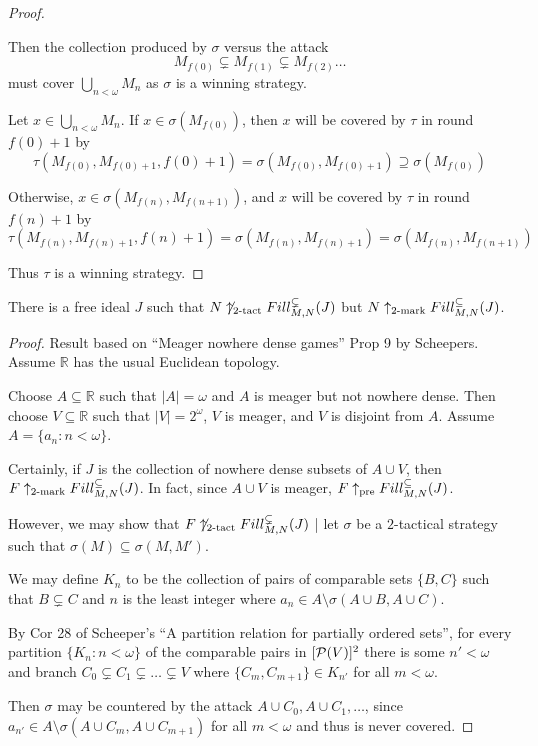 \begin{proof}
\begin{itemize}
          Then the collection produced by $\sigma$ versus the attack 
            \[
              M_{f(0)}\subsetneq M_{f(1)} \subsetneq M_{f(2)} \dots
            \]
          must cover $\bigcup_{n<\omega}M_n$ as $\sigma$ is a winning strategy.

          Let $x \in \bigcup_{n<\omega}M_n$. If $x\in\sigma(M_{f(0)})$, then $x$ will be covered by $\tau$ in round $f(0)+1$ by
            \[
              \tau(M_{f(0)},M_{f(0)+1},f(0)+1)
              = \sigma(M_{f(0)},M_{f(0)+1})
              \supseteq \sigma(M_{f(0)})
            \]

          Otherwise, $x\in\sigma(M_{f(n)},M_{f(n+1)})$, and $x$ will be covered by $\tau$ in round $f(n)+1$ by
            \[
              \tau(M_{f(n)},M_{f(n)+1},f(n)+1)
              = \sigma(M_{f(n)},M_{f(n)+1})
              = \sigma(M_{f(n)},M_{f(n+1)})
            \]
      \end{itemize}

      Thus $\tau$ is a winning strategy.
  \end{proof}

  \begin{example}
    There is a free ideal $J$ such that $N\not\uparrow_{2\text{-tact}}Fill^{\subsetneq}_{M,N}(J)$ but $N\uparrow_{2\text{-mark}}Fill^{\subseteq}_{M,N}(J)$.
  \end{example}

  \begin{proof}
    Result based on ``Meager nowhere dense games'' Prop 9 by Scheepers. Assume $\mathbb{R}$ has the usual Euclidean topology.

    Choose $A\subseteq\mathbb{R}$ such that $|A|=\omega$ and $A$ is meager but not nowhere dense. Then choose $V\subseteq\mathbb{R}$ such that $|V|=2^\omega$, $V$ is meager, and $V$ is disjoint from $A$. Assume $A=\{a_n:n<\omega\}$.

    Certainly, if $J$ is the collection of nowhere dense subsets of $A\cup V$, then $F\uparrow_{2\text{-mark}}Fill^{\subseteq}_{M,N}(J)$. In fact, since $A\cup V$ is meager, $F\uparrow_{\text{pre}}Fill^{\subseteq}_{M,N}(J)$. 

    However, we may show that $F\not\uparrow_{2\text{-tact}}Fill^{\subsetneq}_{M,N}(J)$ | let $\sigma$ be a $2$-tactical strategy such that $\sigma(M)\subseteq\sigma(M,M')$.

    We may define $K_n$ to be the collection of pairs of comparable sets $\{B,C\}$ such that $B\subsetneq C$ and $n$ is the least integer where $a_n \in A \setminus \sigma(A\cup B,A\cup C)$.

    By Cor 28 of Scheeper's ``A partition relation for partially ordered sets'', for every partition $\{K_n:n<\omega\}$ of the comparable pairs in $[\mathcal{P}(V)]^2$ there is some $n'<\omega$ and branch $C_0\subsetneq C_1\subsetneq \dots\subsetneq V$ where $\{C_m,C_{m+1}\}\in K_{n'}$ for all $m<\omega$.

    Then $\sigma$ may be countered by the attack $A\cup C_0, A\cup C_1, \dots$, since $a_{n'} \in A \setminus \sigma(A\cup C_m,A\cup C_{m+1})$ for all $m<\omega$ and thus is never covered.
  \end{proof}









